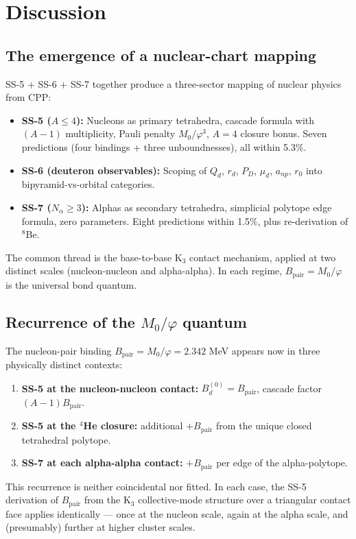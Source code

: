 \documentclass[11pt,letterpaper]{article}
\newcommand{\phig}{\varphi}
\newcommand{\Mzero}{M_0}
\newcommand{\Bpair}{B_{\mathrm{pair}}}
\newcommand{\Nalpha}{N_{\alpha}}
\begin{document}
\section{Discussion}
\label{sec:discussion}

\subsection{The emergence of a nuclear-chart mapping}

SS-5 + SS-6 + SS-7 together produce a three-sector mapping of nuclear physics from CPP:
\begin{itemize}
\item \textbf{SS-5 ($A \leq 4$):} Nucleons as primary tetrahedra, cascade formula with $(A-1)$ multiplicity, Pauli penalty $\Mzero/\phig^3$, $A=4$ closure bonus. Seven predictions (four bindings + three unboundnesses), all within 5.3\%.
\item \textbf{SS-6 (deuteron observables):} Scoping of $Q_d$, $r_d$, $P_D$, $\mu_d$, $a_{np}$, $r_0$ into bipyramid-vs-orbital categories.
\item \textbf{SS-7 ($\Nalpha \geq 3$):} Alphas as secondary tetrahedra, simplicial polytope edge formula, zero parameters. Eight predictions within 1.5\%, plus re-derivation of ${}^8$Be.
\end{itemize}

The common thread is the base-to-base K$_3$ contact mechanism, applied at two distinct scales (nucleon-nucleon and alpha-alpha). In each regime, $\Bpair = \Mzero/\phig$ is the universal bond quantum.

\subsection{Recurrence of the $\Mzero/\phig$ quantum}

The nucleon-pair binding $\Bpair = \Mzero/\phig = 2.342$ MeV appears now in three physically distinct contexts:
\begin{enumerate}
\item \textbf{SS-5 at the nucleon-nucleon contact:} $B_d^{(0)} = \Bpair$, cascade factor $(A-1)\Bpair$.
\item \textbf{SS-5 at the ${}^4$He closure:} additional $+\Bpair$ from the unique closed tetrahedral polytope.
\item \textbf{SS-7 at each alpha-alpha contact:} $+\Bpair$ per edge of the alpha-polytope.
\end{enumerate}
This recurrence is neither coincidental nor fitted. In each case, the SS-5 derivation of $\Bpair$ from the K$_3$ collective-mode structure over a triangular contact face applies identically --- once at the nucleon scale, again at the alpha scale, and (presumably) further at higher cluster scales.
\end{document}
